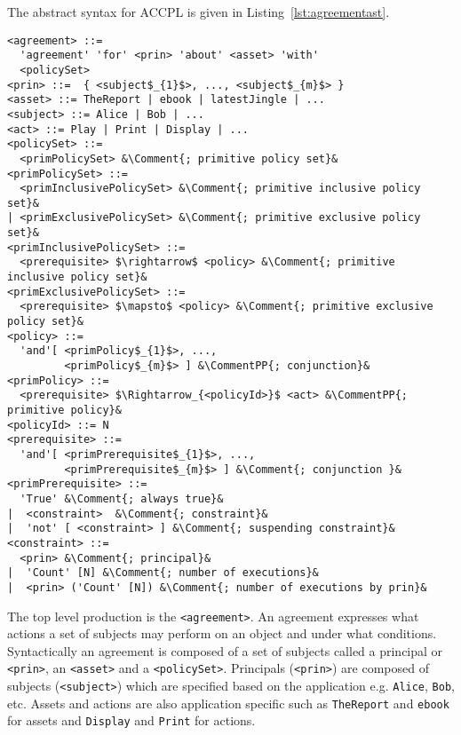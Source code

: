 \documentclass[runningheads,a4paper]{llncs}
\newcommand{\syn}{\texttt}
\begin{document}
The abstract syntax for \ac{ACCPL} is given in Listing~\ref{lst:agreementast}. 
\newcommand*{\Comment}[1]{\hfill\makebox[5.0cm][l]{#1}}%
\newcommand*{\CommentPP}[1]{\hfill\makebox[3.0cm][l]{#1}}%
\renewcommand{\thelstlisting}{\thesection-\arabic{lstlisting}}%
\lstset{mathescape, captionpos=b, language=AST, escapechar=\&} 
\begin{lstlisting}[frame=single, caption={Abstract Syntax for ACCPL},label={lst:agreementast}]
<agreement> ::= 
  'agreement' 'for' <prin> 'about' <asset> 'with'
  <policySet> 
<prin> ::=  { <subject$_{1}$>, ..., <subject$_{m}$> }
<asset> ::= TheReport | ebook | latestJingle | ...
<subject> ::= Alice | Bob | ...
<act> ::= Play | Print | Display | ...
<policySet> ::=  
  <primPolicySet> &\Comment{; primitive policy set}&
<primPolicySet> ::=  
  <primInclusivePolicySet> &\Comment{; primitive inclusive policy set}&
| <primExclusivePolicySet> &\Comment{; primitive exclusive policy set}&
<primInclusivePolicySet> ::=  
  <prerequisite> $\rightarrow$ <policy> &\Comment{; primitive inclusive policy set}&
<primExclusivePolicySet> ::=  
  <prerequisite> $\mapsto$ <policy> &\Comment{; primitive exclusive policy set}&
<policy> ::=  
  'and'[ <primPolicy$_{1}$>, ..., 
         <primPolicy$_{m}$> ] &\CommentPP{; conjunction}&
<primPolicy> ::=  
  <prerequisite> $\Rightarrow_{<policyId>}$ <act> &\CommentPP{; primitive policy}&
<policyId> ::= N 
<prerequisite> ::=    
  'and'[ <primPrerequisite$_{1}$>, ..., 
         <primPrerequisite$_{m}$> ] &\Comment{; conjunction }&
<primPrerequisite> ::=  
  'True' &\Comment{; always true}&
|  <constraint>	 &\Comment{; constraint}&
|  'not' [ <constraint> ] &\Comment{; suspending constraint}&    
<constraint> ::=  
  <prin> &\Comment{; principal}&
|  'Count' [N] &\Comment{; number of executions}&
|  <prin> ('Count' [N]) &\Comment{; number of executions by prin}&     
\end{lstlisting}
The top level production is the \syn{<agreement>}. An agreement expresses what actions a set of subjects may perform on an object and under what conditions. Syntactically an agreement is composed of a set of subjects called a principal or \syn{<prin>}, an \syn{<asset>} and a \syn{<policySet>}. Principals (\syn{<prin>}) are composed of subjects (\syn{<subject>}) which are specified based on the application e.g. \syn{Alice}, \syn{Bob}, etc. Assets and actions are also application specific such as \syn{TheReport} and \syn{ebook} for assets and \syn{Display} and \syn{Print} for actions. 
\end{document}
